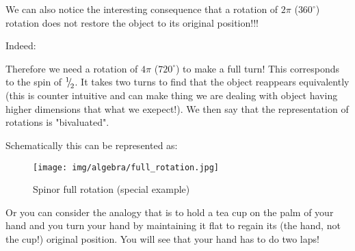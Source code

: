 	We can also notice the interesting consequence that a rotation of $2\pi$ ($360^\circ$) rotation does not restore the object to its original position!!!
	
	Indeed:
	
	Therefore we need a rotation of $4\pi$ ($720^\circ$) to make a full turn! This corresponds to the spin of ${}^1{\mskip -5mu/\mskip -3mu}_2$. It takes two turns to find that the object reappears equivalently (this is counter intuitive and can make thing we are dealing with object having higher dimensions that what we exepect!). We then say that the representation of rotations is "bivaluated".
	
	Schematically this can be represented as:
	\begin{figure}[H]
		\centering
		\texttt{[image: img/algebra/full\_rotation.jpg]}
		\caption{Spinor full rotation (special example)}
	\end{figure}
	Or you can consider the analogy that is to hold a tea cup on the palm of your hand and you turn your hand by maintaining it flat to regain its (the hand, not the cup!) original position. You will see that your hand has to do two laps!
	
	\pagebreak
